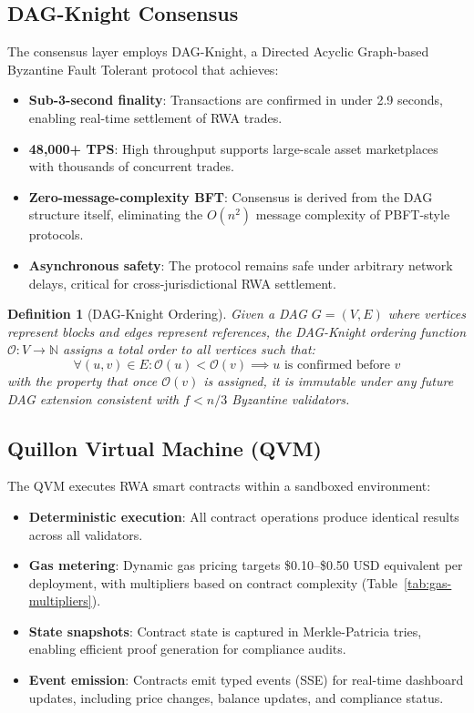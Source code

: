 \documentclass[11pt,a4paper,twoside]{article}
\newtheorem{definition}{Definition}[section]
\begin{document}
\subsection{DAG-Knight Consensus}

The consensus layer employs DAG-Knight, a Directed Acyclic Graph-based Byzantine Fault Tolerant protocol that achieves:

\begin{itemize}
  \item \textbf{Sub-3-second finality}: Transactions are confirmed in under 2.9 seconds, enabling real-time settlement of RWA trades.
  \item \textbf{48,000+ TPS}: High throughput supports large-scale asset marketplaces with thousands of concurrent trades.
  \item \textbf{Zero-message-complexity BFT}: Consensus is derived from the DAG structure itself, eliminating the $O(n^2)$ message complexity of PBFT-style protocols.
  \item \textbf{Asynchronous safety}: The protocol remains safe under arbitrary network delays, critical for cross-jurisdictional RWA settlement.
\end{itemize}

\begin{definition}[DAG-Knight Ordering]
Given a DAG $G = (V, E)$ where vertices represent blocks and edges represent references, the DAG-Knight ordering function $\mathcal{O}: V \rightarrow \mathbb{N}$ assigns a total order to all vertices such that:
\begin{equation}
\forall (u, v) \in E: \mathcal{O}(u) < \mathcal{O}(v) \implies u \text{ is confirmed before } v
\end{equation}
with the property that once $\mathcal{O}(v)$ is assigned, it is immutable under any future DAG extension consistent with $f < n/3$ Byzantine validators.
\end{definition}

\subsection{Quillon Virtual Machine (QVM)}

The QVM executes RWA smart contracts within a sandboxed environment:

\begin{itemize}
  \item \textbf{Deterministic execution}: All contract operations produce identical results across all validators.
  \item \textbf{Gas metering}: Dynamic gas pricing targets \$0.10--\$0.50 USD equivalent per deployment, with multipliers based on contract complexity (Table~\ref{tab:gas-multipliers}).
  \item \textbf{State snapshots}: Contract state is captured in Merkle-Patricia tries, enabling efficient proof generation for compliance audits.
  \item \textbf{Event emission}: Contracts emit typed events (SSE) for real-time dashboard updates, including price changes, balance updates, and compliance status.
\end{itemize}
\end{document}
